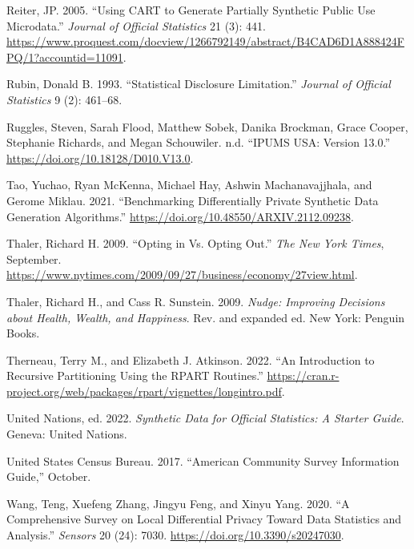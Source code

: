 \documentclass[
]{urban-formatting}
\newlength{\cslhangindent}
\newlength{\cslentryspacingunit} %
\newenvironment{CSLReferences}[2] %
 {%
  \setlength{\parindent}{0pt}
  \ifodd #1
  \let\oldpar\par
  \def\par{\hangindent=\cslhangindent\oldpar}
  \fi
  \setlength{\parskip}{#2\cslentryspacingunit}
 }%
 {}
\begin{document}
\begin{CSLReferences}{1}{0}
\leavevmode{}%
Reiter, JP. 2005. {``Using CART to Generate Partially Synthetic Public
Use Microdata.''} \emph{Journal of Official Statistics} 21 (3): 441.
\url{https://www.proquest.com/docview/1266792149/abstract/B4CAD6D1A888424FPQ/1?accountid=11091}.

\leavevmode{}%
Rubin, Donald B. 1993. {``Statistical Disclosure Limitation.''}
\emph{Journal of Official Statistics} 9 (2): 461--68.

\leavevmode{}%
Ruggles, Steven, Sarah Flood, Matthew Sobek, Danika Brockman, Grace
Cooper, Stephanie Richards, and Megan Schouwiler. n.d. {``IPUMS USA:
Version 13.0.''} \url{https://doi.org/10.18128/D010.V13.0}.

\leavevmode{}%
Tao, Yuchao, Ryan McKenna, Michael Hay, Ashwin Machanavajjhala, and
Gerome Miklau. 2021. {``Benchmarking Differentially Private Synthetic
Data Generation Algorithms.''}
\url{https://doi.org/10.48550/ARXIV.2112.09238}.

\leavevmode{}%
Thaler, Richard H. 2009. {``Opting in Vs. Opting Out.''} \emph{The New
York Times}, September.
\url{https://www.nytimes.com/2009/09/27/business/economy/27view.html}.

\leavevmode{}%
Thaler, Richard H., and Cass R. Sunstein. 2009. \emph{Nudge: Improving
Decisions about Health, Wealth, and Happiness}. Rev. and expanded ed.
New York: Penguin Books.

\leavevmode{}%
Therneau, Terry M., and Elizabeth J. Atkinson. 2022. {``An Introduction
to Recursive Partitioning Using the RPART Routines.''}
\url{https://cran.r-project.org/web/packages/rpart/vignettes/longintro.pdf}.

\leavevmode{}%
United Nations, ed. 2022. \emph{Synthetic Data for Official Statistics:
A Starter Guide}. Geneva: United Nations.

\leavevmode{}%
United States Census Bureau. 2017. {``American Community Survey
Information Guide,''} October.

\leavevmode{}%
Wang, Teng, Xuefeng Zhang, Jingyu Feng, and Xinyu Yang. 2020. {``A
Comprehensive Survey on Local Differential Privacy Toward Data
Statistics and Analysis.''} \emph{Sensors} 20 (24): 7030.
\url{https://doi.org/10.3390/s20247030}.


\end{CSLReferences}
\end{document}
